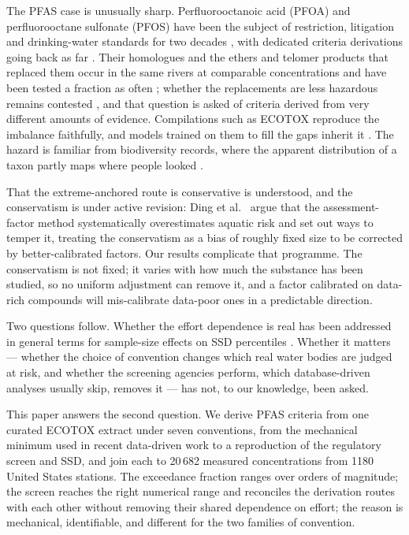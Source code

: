 \documentclass[preprint,12pt]{elsarticle}
\begin{document}
The PFAS case is unusually sharp. Perfluorooctanoic acid (PFOA) and
perfluorooctane sulfonate (PFOS) have been the subject of restriction,
litigation and drinking-water standards for two decades
\cite{kwiatkowski2020class}, with dedicated criteria derivations going back as
far \cite{giesy2011pfospnec}. Their homologues and the ethers and telomer
products that replaced them occur in the same rivers at comparable
concentrations and have been tested a fraction as often
\cite{ankley2021pfasrisk}; whether the replacements are less hazardous remains
contested \cite{brandsma2022genxsub}, and that question is asked of criteria
derived from very different amounts of evidence. Compilations such as ECOTOX
\cite{olker2022ecotox} reproduce the imbalance faithfully, and models trained
on them to fill the gaps inherit it \cite{khan2019ecotoxqsar,
liang2025datagaps, sarkar2026pfasqsar}. The hazard is familiar from
biodiversity records, where the apparent distribution of a taxon partly maps
where people looked \cite{yang2015samplingbias}.

That the extreme-anchored route is conservative is understood, and the
conservatism is under active revision: Ding et al.\ \cite{ding2026af} argue
that the assessment-factor method systematically overestimates aquatic risk and
set out ways to temper it, treating the conservatism as a bias of roughly fixed
size to be corrected by better-calibrated factors. Our results complicate that
programme. The conservatism is not fixed; it varies with how much the substance
has been studied, so no uniform adjustment can remove it, and a factor
calibrated on data-rich compounds will mis-calibrate data-poor ones in a
predictable direction.

Two questions follow. Whether the effort dependence is real has been addressed
in general terms for sample-size effects on SSD percentiles
\cite{newman2000ssd, aldenberg2000hcunc, zhao2016ssdmodel}. Whether it matters
--- whether the choice of convention changes which real water bodies are judged
at risk, and whether the screening agencies perform, which database-driven
analyses usually skip, removes it --- has not, to our knowledge, been asked.

This paper answers the second question. We derive PFAS criteria from one
curated ECOTOX extract under seven conventions, from the mechanical minimum
used in recent data-driven work to a reproduction of the regulatory screen and
SSD, and join each to 20\,682 measured concentrations from 1180 United States
stations. The exceedance fraction ranges over orders of magnitude; the screen
reaches the right numerical range and reconciles the derivation routes with
each other without removing their shared dependence on effort; the reason is
mechanical, identifiable, and different for the two families of convention.
\end{document}

